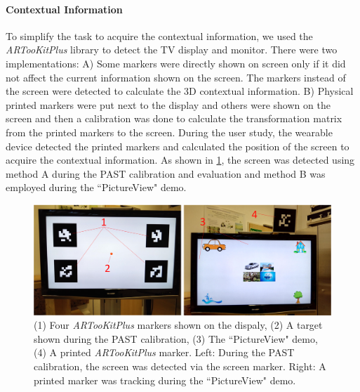 \paragraph{Contextual Information} {\label{sec:4-PAST:markerDetection}}
To simplify the task to acquire the contextual information, we used the \textit{ARTooKitPlus}\cite{Wagner2007a} library to detect the TV display and monitor. There were two implementations: A) Some markers were directly shown  on screen only if it did not affect the current information shown on the screen. The markers instead of the screen were detected to calculate the 3D contextual information. B) Physical printed markers were put next to the display and others were shown on the screen and then a calibration was done to calculate the transformation matrix from the printed markers to the screen. During the user study, the wearable device detected the printed markers and calculated the position of the screen to acquire the contextual information. As shown in \figurename{ \ref{fig:4-PAST:MarkerTracking}}, the screen was detected using method A during the PAST calibration and evaluation and method B was employed during the ``PictureView" demo.
\begin{figure}[htb]
	\centering
	\includegraphics[width = \linewidth]{figures/4-PAST/display.png}
	\caption{(1) Four \textit{ARTooKitPlus} markers shown on the dispaly, (2) A target shown during the PAST calibration, (3) The ``PictureView" demo, (4) A printed \textit{ARTooKitPlus} marker. Left: During the PAST calibration, the screen was detected via the screen marker. Right: A printed marker was tracking during the ``PictureView" demo.}
	\label{fig:4-PAST:MarkerTracking}
\end{figure}
